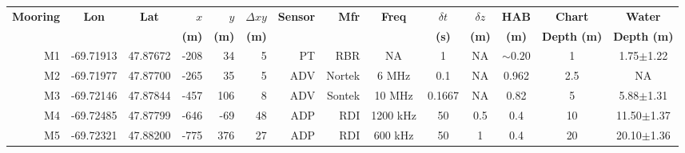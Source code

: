 \documentclass[letterpaper,10pt,landscape]{article}
\begin{document}
\thispagestyle{empty}



\begin{table}
  \label{t:mooring_table}
  \centering
  \begin{tabular}{|r|c|c|r|r|r|r|r|c|c|c|c|c|c|} \hline
    {\bf Mooring}       & {\bf Lon}                  & {\bf Lat}                 & $x$                    & $y$                  & $\Delta xy$         & {\bf Sensor} &{\bf Mfr}   & {\bf Freq}&$\delta t$ &$\delta z$& {\bf HAB}  & {\bf Chart}        & {\bf Water}       \\
    ~                   &                            &                           & {\bf (m)}              & {\bf (m)}            & {\bf (m)}           &              &            &           & {\bf (s)} & {\bf (m)}& {\bf (m)}  & {\bf Depth (m)}    & {\bf Depth (m)}   \\\hline \hline
    M1                  & -69.71913                  & 47.87672                  & -208                   & 34                   & 5                   & PT           & RBR        & NA        & 1         & NA       & $\sim0.20$ & 1                  &  1.75$\pm$1.22    \\\hline
    M2                  & -69.71977                  & 47.87700                  & -265                   & 35                   & 5                   & ADV          & Nortek     & 6 MHz     & 0.1       & NA       & 0.962      & 2.5                &  NA               \\\hline %
    M3                  & -69.72146                  & 47.87844                  & -457                   & 106                  & 8                   & ADV          & Sontek     & 10 MHz    & 0.1667    & NA       & 0.82       & 5                  &  5.88$\pm$1.31    \\\hline
    M4                  & -69.72485                  & 47.87799                  & -646                   & -69                  & 48                  & ADP          & RDI        & 1200 kHz  & 50        & 0.5      & 0.4        & 10                 &  11.50$\pm$1.37   \\\hline
    M5                  & -69.72321                  & 47.88200                  & -775                   & 376                  & 27                  & ADP          & RDI        & 600 kHz   & 50        & 1        & 0.4        & 20                 &  20.10$\pm$1.36   \\\hline

\end{tabular}
\end{table}
\end{document}
